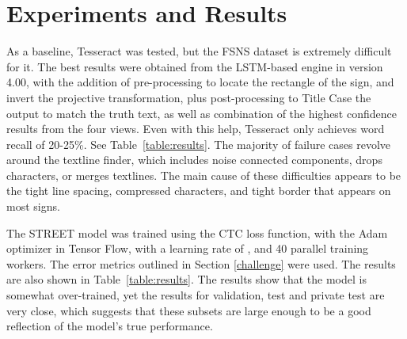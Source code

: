 \documentclass[runningheads]{llncs}
\begin{document}
\section{Experiments and Results}
As a baseline, Tesseract \cite{tutorial} was tested, but the FSNS dataset is extremely difficult for it.
 The best results were obtained from the LSTM-based engine in version 4.00, with the addition of
pre-processing to locate the rectangle of the sign, and invert the projective transformation, plus
post-processing to Title Case the output to match the truth text, as well as combination of the highest confidence
results from the four views.
Even with this help, Tesseract only achieves word recall of 20-25\%. See Table~\ref{table:results}.
The majority of failure cases revolve around the textline finder, which includes noise connected components,
 drops characters, or merges textlines. The main cause of these difficulties appears to be the tight line spacing,
compressed characters, and tight border that appears on most signs.

The STREET model was trained using the CTC \cite{graves2006connectionist} loss function,
 with the Adam optimizer \cite{kingma2014adam} in Tensor Flow,
 with a learning rate of , and 40 parallel training workers.
The error metrics outlined in Section \ref{challenge} were used.
The results are also shown in
 Table~\ref{table:results}.
 The results show that the model is somewhat over-trained, yet the results for validation, test and private test are very
 close, which suggests that these subsets are large enough to be a good reflection of the model's true
 performance.
\end{document}
